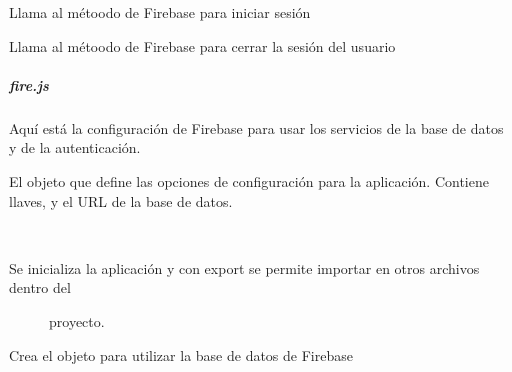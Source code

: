 \begin{fulllineitems}
\label{\detokenize{code_docs:doSignInWithEmailAndPassword}}
Llama al métoodo de Firebase para iniciar sesión

\end{fulllineitems}


\begin{fulllineitems}
\label{\detokenize{code_docs:doSignOut}}
Llama al métoodo  de Firebase para cerrar la sesión del usuario

\end{fulllineitems}



\subparagraph{fire.js}
\label{\detokenize{code_docs:fire-js}}
Aquí está la configuración de Firebase para usar los servicios de la base de datos
y de la autenticación.

\begin{fulllineitems}
\label{\detokenize{code_docs:config}}
El objeto que define las opciones de configuración para la aplicación.
Contiene llaves, y el URL de la base de datos.

\end{fulllineitems}


\begin{fulllineitems}
\label{\detokenize{code_docs:fire}}~\begin{description}
\item[{Se inicializa la aplicación y con export se permite importar en otros archivos dentro del}] \leavevmode
proyecto.

\end{description}

\end{fulllineitems}


\begin{fulllineitems}
\label{\detokenize{code_docs:db}}
Crea el objeto para utilizar la base de datos de Firebase

\end{fulllineitems}

